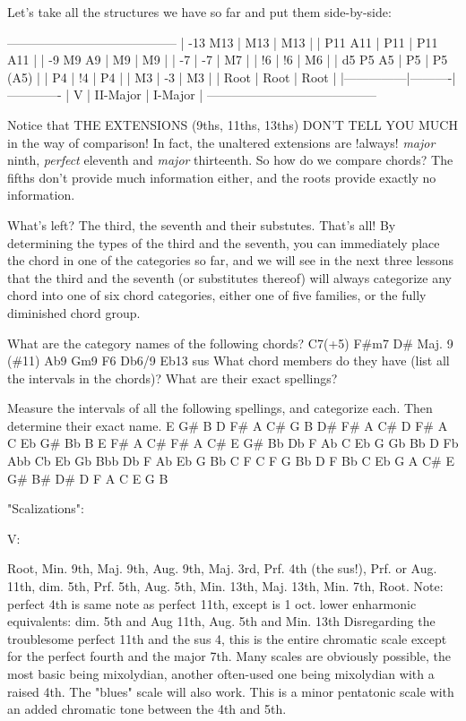 Let's take all the structures we have so far and put them side-by-side:

-----------------------------------------
| -13  M13      |   M13    |  M13       |
|      P11  A11 |   P11    |  P11  A11  |
|  -9   M9   A9 |    M9    |   M9       |
|       -7      |    -7    |   M7       |
|       !6      |    !6    |   M6       |
|  d5   P5   A5 |    P5    |   P5 (A5)  |
|       P4      |    !4    |   P4       |
|       M3      |    -3    |   M3       |
|      Root     |   Root   |  Root      |
|---------------|----------|-------------
|        V      | II-Major | I-Major    |
-----------------------------------------

Notice that THE EXTENSIONS (9ths, 11ths, 13ths) DON'T TELL YOU MUCH in the way
of comparison! In fact, the unaltered extensions are !always! \emph{major} ninth,
\emph{perfect} eleventh and \emph{major} thirteenth. So how do we compare chords? The
fifths don't provide much information either, and the roots provide exactly no
information. 

What's left? The third, the seventh and their substutes. That's all! By
determining the types of the third and the seventh, you can immediately
place the chord in one of the categories so far, and we will see in the
next three lessons that the third and the seventh (or substitutes
thereof) will always categorize any chord into one of six chord
categories, either one of five families, or the fully diminished chord
group.  

What are the category names of the following chords?
C7(+5) F\#m7 D\# Maj. 9 (\#11) Ab9 Gm9 F6 Db6/9 Eb13 sus
What chord members do they have (list all the intervals in the chords)?
What are their exact spellings?

Measure the intervals of all the following spellings, and categorize each.
Then determine their exact name.
E G\# B D F\# A C\#
G B D\# F\# A C\#
D F\# A C Eb G\# Bb
B E F\# A C\#
F\# A C\# E G\#
Bb Db F Ab C Eb G
Gb Bb D Fb Abb
Cb Eb Gb Bbb Db F Ab
Eb G Bb C F
C F G Bb D
F Bb C Eb G
A C\# E G\# B\# D\#
D F A C E G B

"Scalizations":

V:

Root, Min. 9th, Maj. 9th, Aug. 9th, Maj. 3rd, Prf. 4th (the sus!), 
Prf. or Aug. 11th, dim. 5th, Prf. 5th, Aug. 5th, Min. 13th, Maj. 13th,
Min. 7th, Root.
Note: perfect 4th is same note as perfect 11th, except is 1 oct. lower
      enharmonic equivalents: dim. 5th and Aug 11th, 
                              Aug. 5th and Min. 13th
Disregarding the troublesome perfect 11th and the sus 4, this is the
entire chromatic scale except for the perfect fourth and the 
major 7th. Many scales are obviously possible, the most basic being 
mixolydian, another often-used one being mixolydian with a raised 4th.
The "blues" scale will also work. This is a minor pentatonic scale with 
an added chromatic tone between the 4th and 5th.

